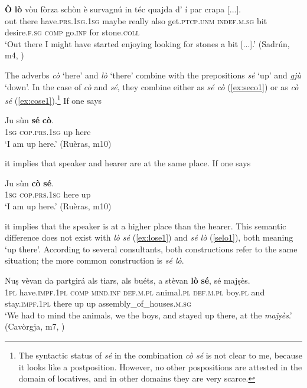 \ea
\label{ex:olo1}
\gll  \textbf{Ò} \textbf{lò} vòu fòrza schòn è survagnú in téc quajda d' í par crapa [...].\\
out there  have.\textsc{prs.1sg.1sg} maybe really also get.\textsc{ptcp.unm} \textsc{indef.m.sg} bit desire.\textsc{f.sg} \textsc{comp} go.\textsc{inf} for stone.\textsc{coll}\\
\glt `Out there I might have started enjoying looking for stones a bit [...].' (Sadrún, m4, )
\z

The adverbs \textit{cò} `here' and \textit{lò} `there' combine with the prepositions \textit{sé} `up' and \textit{gjù} `down'. In the case of \textit{cò} and \textit{sé}, they combine either as \textit{sé cò} (\ref{ex:seco1}) or as \textit{cò sé} (\ref{ex:cose1}).\footnote{The syntactic status of \textit{sé} in the combination \textit{cò sé} is not clear to me, because it looks like a postposition. However, no other pospositions are attested in the domain of locatives, and in other domains they are very scarce.} If one says

\ea
\label{ex:seco1}
\gll Ju sùn \textbf{sé} \textbf{cò}.\\
\textsc{1sg} \textsc{cop.prs.1sg} up here\\
\glt `I am up here.' (Ruèras, m10)
\z

it implies that speaker and hearer are at the same place. If one says

\ea
\label{ex:cose1}
\gll Ju sùn \textbf{cò} \textbf{sé}.\\
\textsc{1sg} \textsc{cop.prs.1sg} here up\\
\glt `I am up here.' (Ruèras, m10)
\z

it implies that the speaker is at a higher place than the hearer. This semantic difference does not exist with \textit{lò sé} (\ref{ex:lose1}) and \textit{sé lò} (\ref{selo1}), both meaning `up there'. According to several consultants, both constructions refer to the same situation; the more common construction is \textit{sé lò}.

\ea
\label{ex:lose1}
\gll Nuṣ vèvan da partgirá als tiars, als buéts, a stèvan \textbf{lò} \textbf{sé}, sé majṣès.\\
\textsc{1pl} have.\textsc{impf.1pl} \textsc{comp} \textsc{mind.inf} \textsc{def.m.pl} animal.\textsc{pl} \textsc{def.m.pl} boy.\textsc{pl} and stay.\textsc{impf.1pl} there up up assembly\_of\_houses.\textsc{m.sg}\\
\glt `We had to mind the animals, we the boys, and stayed up there, at the \textit{majṣès}.' (Cavòrgja, m7, )
\z

